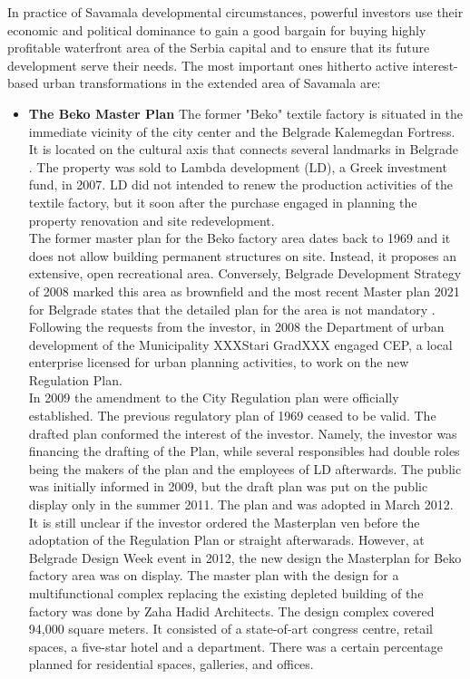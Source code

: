 \documentclass[11pt]{report}
\begin{document}
In practice of Savamala developmental circumstances, powerful investors use their economic and political dominance to gain a good bargain for buying highly profitable waterfront area of the Serbia capital and to ensure that its future development serve their needs. The most important ones hitherto active interest-based urban transformations in the extended area of Savamala are:

\begin{itemize}
\item \textbf{The Beko Master Plan}
The former "Beko" textile factory is situated in the immediate vicinity of the city center and the Belgrade Kalemegdan Fortress. It is located on the cultural axis that connects several landmarks in Belgrade \cite{Vukmirovic in Doytchinov et al 2015}. 
The property was sold to Lambda development (LD), a Greek investment fund, in 2007.
LD did not intended to renew the production activities of the textile factory, but it soon after the purchase engaged in planning the property renovation and site redevelopment.
\\
The former master plan for the Beko factory area dates back to 1969 and it does not allow building permanent structures on site. Instead, it proposes an extensive, open recreational area.
Conversely, Belgrade Development Strategy of 2008 marked this area as brownfield and the most recent Master plan 2021 for Belgrade states that the detailed plan for the area is not mandatory \cite{Vukmirovic in Doytchinov et al 2015}.
Following the requests from the investor, in 2008 the Department of urban development of the Municipality XXXStari GradXXX engaged CEP, a local enterprise licensed for urban planning activities, to work on the new Regulation Plan.
\\
In 2009 the amendment to the City Regulation plan were officially established.
The previous regulatory plan of 1969 ceased to be valid. The drafted plan conformed the interest of the investor. Namely, the investor was financing the drafting of the Plan, while several responsibles had double roles being the makers of the plan and the employees of LD afterwards.
The public was initially informed in 2009, but the draft plan was put on the public display only in the summer 2011. The plan and was adopted in March 2012. 
It is still unclear if the investor ordered the Masterplan ven before the adoptation of the Regulation Plan or straight afterwarads. However, at Belgrade Design Week event in 2012, the new design the Masterplan for Beko factory area was on display. The master plan with the design for a multifunctional complex replacing the existing depleted building of the factory was done by Zaha Hadid Architects. The design complex covered 94,000 square meters. It consisted of a  state-of-art congress  centre,  retail  spaces, a five-star hotel and a department. There was a certain percentage planned for residential spaces, galleries, and offices. 

\end{itemize}
\end{document}
